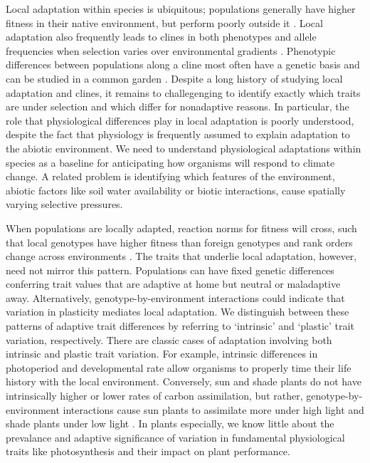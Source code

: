 \documentclass[11pt, oneside]{article}
\begin{document}

Local adaptation within species is ubiquitous; populations generally have higher fitness in their native environment, but perform poorly outside it \citep{Schluter_2000, Hereford_2009}. Local adaptation also frequently leads to clines in both phenotypes and allele frequencies when selection varies over environmental gradients \citep{Huxley_1938, Endler_1977}. Phenotypic differences between populations along a cline most often have a genetic basis and can be studied in a common garden \citep{Turesson_1922, Clausen_etal_1940, Hiesey_etal_1942}. Despite a long history of studying local adaptation and clines, it remains to challegenging to identify exactly which traits are under selection and which differ for nonadaptive reasons. In particular, the role that physiological differences play in local adaptation is poorly understood, despite the fact that physiology is frequently assumed to explain adaptation to the abiotic environment. We need to understand physiological adaptations within species as a baseline for anticipating how organisms will respond to climate change. A related problem is identifying which features of the environment, abiotic factors like soil water availability or biotic interactions, cause spatially varying selective pressures. %

When populations are locally adapted, reaction norms for fitness will cross, such that local genotypes have higher fitness than foreign genotypes and rank orders change across environments \citep{Kawecki_Ebert_2004}. The traits that underlie local adaptation, however, need not mirror this pattern. Populations can have fixed genetic differences conferring trait values that are adaptive at home but neutral or maladaptive away. Alternatively, genotype-by-environment interactions could indicate that variation in plasticity mediates local adaptation. We distinguish between these patterns of adaptive trait differences by referring to `intrinsic' and `plastic' trait variation, respectively. There are classic cases of adaptation involving both intrinsic and plastic trait variation. For example, intrinsic differences in photoperiod \citep{Blackman_etal_2011} and developmental rate \citep{Stinchcombe_etal_2004} allow organisms to properly time their life history with the local environment. Conversely, sun and shade plants do not have intrinsically higher or lower rates of carbon assimilation, but rather, genotype-by-environment interactions cause sun plants to assimilate more under high light and shade plants under low light \citep{Givnish_1988}. In plants especially, we know little about the prevalance and adaptive significance of variation in fundamental physiological traits like photosynthesis and their impact on plant performance.
\end{document}
